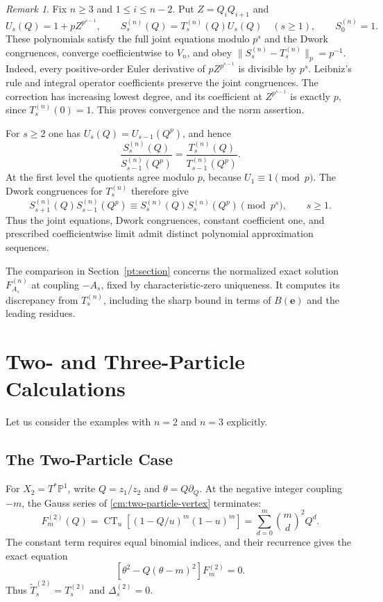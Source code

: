 \documentclass[11pt]{amsart}
\theoremstyle{definition}
\theoremstyle{remark}
\newtheorem{remark}[theorem]{Remark}
\numberwithin{equation}{section}
\DeclareMathOperator{\CT}{CT}
\begin{document}
\begin{remark}\label{pt:frobenius-ambiguity}
Fix $n\geq3$ and $1\leq i\leq n-2$. Put $Z=Q_iQ_{i+1}$ and
\[
 U_s(Q)=1+pZ^{p^{s-1}},\qquad
 S_s^{(n)}(Q)=T_s^{(n)}(Q)U_s(Q)\quad(s\geq1),\qquad S_0^{(n)}=1.
\]
These polynomials satisfy the full joint equations modulo $p^s$
and the Dwork congruences, converge coefficientwise to $V_n$,
and obey $\|S_s^{(n)}-T_s^{(n)}\|_p=p^{-1}$.
Indeed, every positive-order Euler derivative of
$pZ^{p^{s-1}}$ is divisible by $p^s$.
Leibniz's rule and integral operator coefficients preserve the
joint congruences. The correction has increasing lowest degree,
and its coefficient at $Z^{p^{s-1}}$ is exactly $p$, since
$T_s^{(n)}(0)=1$. This proves convergence and the norm assertion.

For $s\geq2$ one has $U_s(Q)=U_{s-1}(Q^p)$, and hence
\begin{equation}\label{pt:twisted-frobenius-quotient}
 \frac{S_s^{(n)}(Q)}{S_{s-1}^{(n)}(Q^p)}
 =\frac{T_s^{(n)}(Q)}{T_{s-1}^{(n)}(Q^p)}.
\end{equation}
At the first level the quotients agree modulo $p$, because
$U_1\equiv1\pmod p$. The Dwork congruences for $T_s^{(n)}$
therefore give
\begin{equation}\label{pt:twisted-dwork}
 S_{s+1}^{(n)}(Q)S_{s-1}^{(n)}(Q^p)
 \equiv S_s^{(n)}(Q)S_s^{(n)}(Q^p)\pmod{p^s},\qquad s\geq1.
\end{equation}
Thus the joint equations, Dwork congruences, constant coefficient
one, and prescribed coefficientwise limit admit distinct
polynomial approximation sequences.

The comparison in Section~\ref{pt:section} concerns the normalized exact solution
$F_{A_s}^{(n)}$ at coupling $-A_s$, fixed by characteristic-zero
uniqueness. It computes its discrepancy from $T_s^{(n)}$,
including the sharp bound in terms of $B(\boldsymbol e)$ and the
leading residues.
\end{remark}


\section{Two- and Three-Particle Calculations}
\label{fl:section}
Let us consider the examples with $n=2$ and $n=3$ explicitly.

\subsection{The Two-Particle Case}
\label{ex:two-particle}
For $X_2=T^*\mathbb P^1$, write $Q=z_1/z_2$ and
$\theta=Q\partial_Q$. At the negative integer coupling $-m$,
the Gauss series of \eqref{cm:two-particle-vertex} terminates:
\begin{equation}\label{ex:two-particle-polynomial}
 F_m^{(2)}(Q)
 =\CT_u[(1-Q/u)^m(1-u)^m]
 =\sum_{d=0}^{m}\binom md^2Q^d.
\end{equation}
The constant term requires equal binomial indices, and their
recurrence gives the exact equation
\[
 [\theta^2-Q(\theta-m)^2]F_m^{(2)}=0.
\]
Thus $\widetilde T_s^{(2)}=T_s^{(2)}$ and
$\Delta_s^{(2)}=0$.
\end{document}
